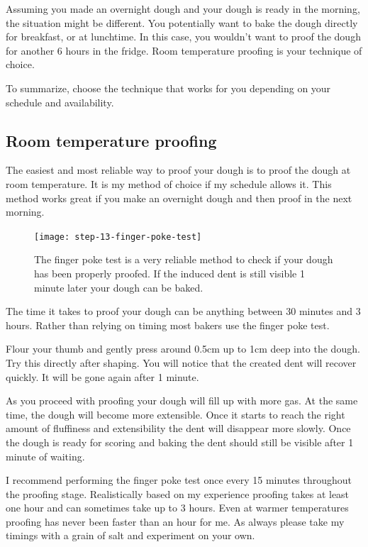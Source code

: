 Assuming you made an overnight dough and your dough is ready in the morning,
the situation might be different. You potentially want to bake the dough directly
for breakfast, or at lunchtime. In this case, you wouldn't want to proof the dough for
another 6 hours in the fridge. Room temperature proofing is your technique
of choice.

To summarize, choose the technique that works for you depending on your
schedule and availability.

\subsection{Room temperature proofing}

The easiest and most reliable way to proof your dough is to proof the dough at
room temperature. It is my method of choice if my schedule allows it. This method
works great if you make an overnight dough and then proof in the next
morning.

\begin{figure}[htb!]
  \texttt{[image: step-13-finger-poke-test]}
  \caption{The finger poke test is a very reliable method to check
  if your dough has been properly proofed. If the induced dent is still
  visible 1 minute later your dough can be baked.}
  \label{fig:shaping-finger-poke}
\end{figure}

The time it takes to proof your dough can be anything between 30 minutes and
3 hours. Rather than relying on timing most bakers use the finger poke test.

Flour your thumb and gently press around 0.5cm up to 1cm deep into the dough.
Try this directly after shaping. You will notice that the created dent will
recover quickly. It will be gone again after 1 minute.

As you proceed with proofing your dough will fill up with more gas. At the
same time, the dough will become more extensible. Once it starts to reach the
right amount of fluffiness and extensibility the dent will disappear more slowly.
Once the dough is ready for scoring and baking the dent should still be visible after
1 minute of waiting.

I recommend performing the finger poke test once every 15 minutes throughout
the proofing stage. Realistically based on my experience proofing takes at least
one hour and can sometimes take up to 3 hours. Even at warmer temperatures proofing
has never been faster than an hour for me. As always please take my timings with
a grain of salt and experiment on your own.

